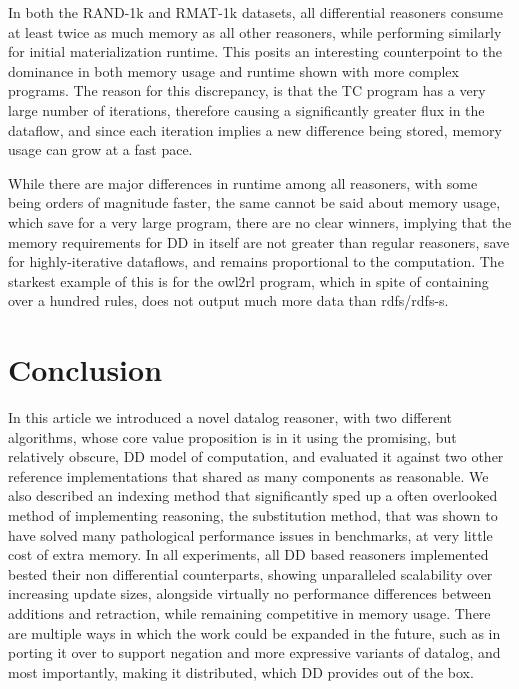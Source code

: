 \documentclass[sigconf,screen,review=false,natbib]{acmart}
\theoremstyle{definition}
\begin{document}
In both the RAND-1k and RMAT-1k datasets, all differential reasoners consume at least twice as much memory as all other reasoners, while performing similarly for initial
materialization runtime. This posits an interesting counterpoint to the dominance in both memory usage and runtime shown with more complex programs. The reason for this
discrepancy, is that the TC program has a very large number of iterations, therefore causing a significantly greater flux in the dataflow, and since each iteration implies
a new difference being stored, memory usage can grow at a fast pace.

While there are major differences in runtime among all reasoners, with some being orders of magnitude faster, the same cannot be said about memory usage, which save for a
very large program, there are no clear winners, implying that the memory requirements for DD in itself are not greater than regular reasoners, save for
highly-iterative dataflows, and remains proportional to the computation. The starkest example of this is for the owl2rl program, which in spite of containing over a hundred
rules, does not output much more data than rdfs/rdfs-s.
\section{Conclusion}
In this article we introduced a novel datalog reasoner, with two different algorithms, whose core value proposition is in it using the promising, but relatively obscure,
DD model of computation, and evaluated it against two other reference implementations that shared as many components as reasonable. We also described an
indexing method that significantly sped up a often overlooked method of implementing reasoning, the substitution method, that was shown to have solved many pathological
performance issues in benchmarks, at very little cost of extra memory. In all experiments, all DD based reasoners implemented bested their non differential
counterparts, showing unparalleled scalability over increasing update sizes, alongside virtually no performance differences between additions and retraction, while remaining
competitive in memory usage. There are multiple ways in which the work could be expanded in the future, such as in porting it over to support negation and more expressive
variants of datalog, and most importantly, making it distributed, which DD provides out of the box.




\appendix
\end{document}
